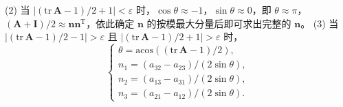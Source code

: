 (2) 当 $|(\mathrm{tr}\,\boldsymbol{A}-1)/2+1|<\varepsilon$ 时，$\cos\theta\approx-1$，$\sin\theta\approx0$，即 $\theta\approx\pi$，$(\boldsymbol{A}+\boldsymbol{I})/2\approx\boldsymbol{n}\boldsymbol{n}^{\mathrm{T}}$，依此确定 $\boldsymbol{n}$ 的按模最大分量后即可求出完整的 $\boldsymbol{n}$。
(3) 当 $|(\mathrm{tr}\,\boldsymbol{A}-1)/2-1|>\varepsilon$ 且 $|(\mathrm{tr}\,\boldsymbol{A}-1)/2+1|>\varepsilon$ 时，
\[
\begin{cases}\theta=\mathrm{acos}\left((\mathrm{tr}\,\boldsymbol{A}-1)/2\right),\\n_1=(a_{32}-a_{23})/(2\sin\theta),\\n_2=(a_{13}-a_{31})/(2\sin\theta),\\n_3=(a_{21}-a_{12})/(2\sin\theta).\end{cases}
\]
